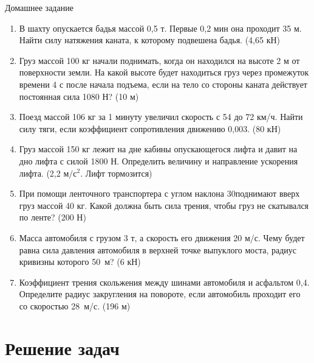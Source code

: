 \documentclass[a5paper, 10pt]{diss_4}
\renewcommand{\'}{\,'}
\begin{document}
\begin{center}
   Домашнее задание
\end{center}
\begin{enumerate}

\item В шахту опускается бадья массой 0,5 т. Первые 0,2 мин она проходит 35 м. Найти силу натяжения каната, к которому подвешена бадья. (4,65 кН)

\item Груз массой 100 кг начали поднимать, когда он находился на высоте 2 м от поверхности земли. На какой высоте будет находиться груз через промежуток времени 4 с после начала подъема, если на тело со стороны каната действует постоянная сила 1080 Н?
(10 м)

\item Поезд массой 106 кг за 1 минуту увеличил скорость с 54 до 72 км/ч. Найти силу тяги, если коэффициент сопротивления движению 0,003. (80 кН)

\item Груз массой 150 кг лежит на дне кабины опускающегося лифта и давит на дно лифта с силой 1800 Н. Определить величину и направление ускорения лифта. (2,2 $м/с^2$. Лифт тормозится)

\item При помощи ленточного транспортера с углом наклона 30\textdegree поднимают вверх груз массой 40 кг. Какой должна быть сила трения, чтобы груз не скатывался по ленте? (200 Н)

\item Масса автомобиля с грузом 3 т, а скорость его движения 20 м/с. Чему будет равна сила давления автомобиля в верхней точке выпуклого моста, радиус кривизны которого 50 м? (6 кН)

\item Коэффициент трения скольжения между шинами автомобиля и асфальтом 0,4. Определите радиус закругления на повороте, если автомобиль проходит его со скоростью 28 м/с. (196 м)

\end{enumerate}


\section{Решение задач}
\end{document}
